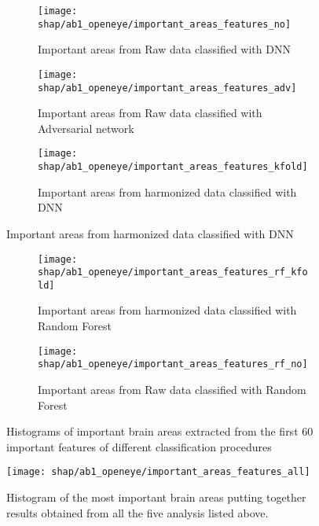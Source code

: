 \documentclass[11pt]{report}
\begin{document}
\begin{figure}
\centering
\begin{subfigure}[b]{1\columnwidth}
   \texttt{[image: shap/ab1\_openeye/important\_areas\_features\_no]}
   \caption{Important areas from Raw data classified with DNN}
    
\end{subfigure}

\begin{subfigure}[b]{1\columnwidth}
   \texttt{[image: shap/ab1\_openeye/important\_areas\_features\_adv]}
   \caption{Important areas from Raw data classified with Adversarial network}
    
\end{subfigure}

\begin{subfigure}[b]{1\columnwidth}
   \texttt{[image: shap/ab1\_openeye/important\_areas\_features\_kfold]}
   \caption{Important areas from harmonized data classified with DNN}
    
\end{subfigure}
\end{figure}
\begin{figure}\ContinuedFloat
\begin{subfigure}[b]{1\columnwidth}
   \texttt{[image: shap/ab1\_openeye/important\_areas\_features\_rf\_kfold]}
   \caption{Important areas from harmonized data classified with Random Forest}
    
\end{subfigure}

\begin{subfigure}[b]{1\columnwidth}
   \texttt{[image: shap/ab1\_openeye/important\_areas\_features\_rf\_no]}
   \caption{Important areas from Raw data classified with Random Forest}
    
\end{subfigure}
\caption{Histograms of important brain areas extracted from the first 60 important features of different classification procedures}
\label{fig:histograms_60_ab1_openeye}
\end{figure}


\begin{figure}[h]
\centering
  \texttt{[image: shap/ab1\_openeye/important\_areas\_features\_all]}
\caption{Histogram of the most important brain areas putting together results obtained from all the five analysis listed above.}
\label{fig:important_areas_features_all_ab1_openeye}
\end{figure}

\newpage



\end{document}
